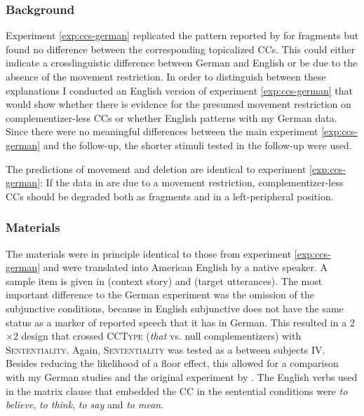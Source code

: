 \subsubsection{Background}
\begin{sloppypar}
Experiment \ref{exp:ccs-german} replicated the pattern reported by \citet{merchant.etal2013} for fragments but found no difference between the corresponding topicalized CCs. This could either indicate a crosslinguistic difference between German and English or be due to the absence of the movement restriction. In order to distinguish between these explanations I conducted an English version of experiment \ref{exp:ccs-german} that would show whether there is evidence for the presumed movement restriction on complementizer-less CCs or whether English patterns with my German data. Since there were no meaningful differences between the main experiment \ref{exp:ccs-german} and the follow-up, the shorter stimuli tested in the follow-up were used.
\end{sloppypar}

The predictions of movement and deletion are identical to experiment \ref{exp:ccs-german}: If the data in \citet{merchant.etal2013} are due to a movement restriction, complementizer-less CCs should be degraded both as fragments and in a left-peripheral position.

\subsubsection{Materials}\label{sec:ccs-english-materials}
The materials were in principle identical to those from experiment \ref{exp:ccs-german} and were translated into American English by a native speaker. A sample item is given in \Next (context story) and \NNext (target utterances). The most important difference to the German experiment was the omission of the subjunctive conditions, because in English subjunctive does not have the same status as a marker of reported speech that it has in German. This resulted in a 2$\times$2 design that crossed \textsc{CCType} (\textit{that} vs. null complementizers) with \textsc{Sententiality}. Again, \textsc{Sententiality} was tested as a between subjects IV. Besides reducing the likelihood of a floor effect, this allowed for a comparison with my German studies and the original experiment by \citet{merchant.etal2013}. The English verbs used in the matrix clause that embedded the CC in the sentential conditions were \textit{to believe}, \textit{to think}, \textit{to say} and \textit{to mean}.

